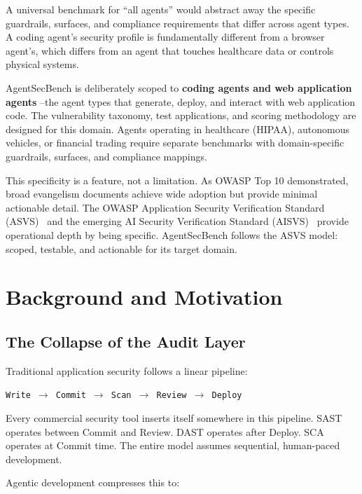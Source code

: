 \documentclass[11pt,twocolumn]{article}
\begin{document}
A universal benchmark for ``all agents'' would abstract away the specific guardrails, surfaces, and compliance requirements that differ across agent types. A coding agent's security profile is fundamentally different from a browser agent's, which differs from an agent that touches healthcare data or controls physical systems.

AgentSecBench is deliberately scoped to \textbf{coding agents and web application agents} --the agent types that generate, deploy, and interact with web application code. The vulnerability taxonomy, test applications, and scoring methodology are designed for this domain. Agents operating in healthcare (HIPAA), autonomous vehicles, or financial trading require separate benchmarks with domain-specific guardrails, surfaces, and compliance mappings.

This specificity is a feature, not a limitation. As OWASP Top 10 demonstrated, broad evangelism documents achieve wide adoption but provide minimal actionable detail. The OWASP Application Security Verification Standard (ASVS)~\cite{asvs} and the emerging AI Security Verification Standard (AISVS)~\cite{aisvs2026} provide operational depth by being specific. AgentSecBench follows the ASVS model: scoped, testable, and actionable for its target domain.

\section{Background and Motivation}

\subsection{The Collapse of the Audit Layer}

Traditional application security follows a linear pipeline:

\begin{center}
\texttt{Write $\rightarrow$ Commit $\rightarrow$ Scan $\rightarrow$ Review $\rightarrow$ Deploy}
\end{center}

Every commercial security tool inserts itself somewhere in this pipeline. SAST operates between Commit and Review. DAST operates after Deploy. SCA operates at Commit time. The entire model assumes sequential, human-paced development.

Agentic development compresses this to:
\end{document}

